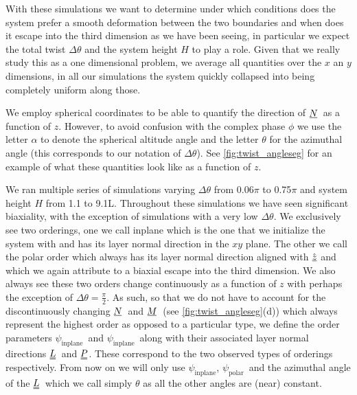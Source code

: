 \documentclass[12pt]{article}
\newcommand{\suf}[2]{\stackunder[0.5pt]{\stackunder[1pt]{\ensuremath{#1}}{\rule{\widthof{\ensuremath{#2}}*\real{0.9}}{.1ex}}}{}}
\newcommand{\duf}[2]{\stackunder[0.5pt]{\stackunder[0.8pt]{\stackunder[1pt]{\ensuremath{#1}}{\rule{\widthof{\ensuremath{#2}}*\real{0.9}}{.1ex}}}{\rule{\widthof{\ensuremath{#2}}*\real{0.9}}{.1ex}}}{}}
\newcommand{\su}[1]{\suf{#1}{#1}}
\newcommand{\du}[1]{\duf{#1}{#1}}
\newcommand{\NN}{\ensuremath{\su{N}}}
\newcommand{\MM}{\ensuremath{\su{M}}}
\newcommand{\sL}{\ensuremath{\psi_\text{inplane}}}
\newcommand{\aL}{\ensuremath{\du{L}}}
\newcommand{\sP}{\ensuremath{\psi_\text{polar}}}
\newcommand{\aP}{\ensuremath{\du{P}}}
\begin{document}
        With these simulations we want to determine under which conditions does the system prefer a smooth deformation between the two boundaries and when does it escape into the third dimension as we have been seeing, in particular we expect the total twist $\Delta\theta$ and the system height $H$ to play a role.
        Given that we really study this as a one dimensional problem, we average all quantities over the $x$ an $y$ dimensions, in all our simulations the system quickly collapsed into being completely uniform along those.

        We employ spherical coordinates to be able to quantify the direction of \NN\ as a function of $z$.
        However, to avoid confusion with the complex phase $\phi$ we use the letter $\alpha$ to denote the spherical altitude angle and the letter $\theta$ for the azimuthal angle (this corresponds to our notation of $\Delta\theta$).
        See \cref{fig:twist_angleseg} for an example of what these quantities look like as a function of $z$.

        We ran multiple series of simulations varying $\Delta\theta$ from 0.06$\pi$ to 0.75$\pi$ and system height $H$ from 1.1 to 9.1\si{L}.
        Throughout these simulations we have seen significant biaxiality, with the exception of simulations with a very low $\Delta\theta$.
        We exclusively see two orderings, one we call inplane which is the one that we initialize the system with and has its layer normal direction in the $xy$ plane.
        The other we call the polar order which always has its layer normal direction aligned with $\hat{\su{z}}$ and which we again attribute to a biaxial escape into the third dimension.
        We also always see these two orders change continuously as a function of $z$ with perhaps the exception of $\Delta\theta = \frac{\pi}{2}$.
        As such, so that we do not have to account for the discontinuously changing \NN\ and \MM\ (see \cref{fig:twist_angleseg}(d)) which always represent the highest order as opposed to a particular type, we define the order parameters \sL\ and \sL\ along with their associated layer normal directions \aL\ and \aP.
        These correspond to the two observed types of orderings respectively.
        From now on we will only use \sL, \sP\ and the azimuthal angle of the \aL\ which we call simply $\theta$ as all the other angles are (near) constant.
\end{document}
